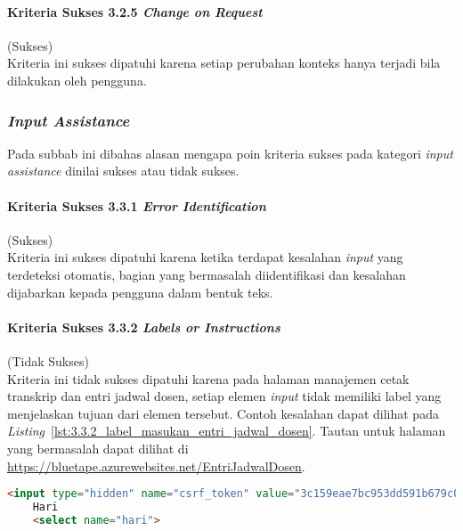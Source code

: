 \paragraph{Kriteria Sukses 3.2.5 \textit{Change on Request}}
\label{par:kepatuhan_bluetape_kriteria_sukses_3.2.5}
(Sukses)\\

Kriteria ini sukses dipatuhi karena setiap perubahan konteks hanya terjadi bila dilakukan oleh pengguna.

\subsubsection{\textit{Input Assistance}}
\label{subsubsec:kepatuhan_bluetape_input_assistance}
Pada subbab ini dibahas alasan mengapa poin kriteria sukses pada kategori \textit{input assistance} dinilai sukses atau tidak sukses.

\paragraph{Kriteria Sukses 3.3.1 \textit{Error Identification}}
\label{par:kepatuhan_bluetape_kriteria_sukses_3.3.1}
(Sukses)\\

Kriteria ini sukses dipatuhi karena ketika terdapat kesalahan \textit{input} yang terdeteksi otomatis, bagian yang bermasalah diidentifikasi dan kesalahan dijabarkan kepada pengguna dalam bentuk teks.

\paragraph{Kriteria Sukses 3.3.2 \textit{Labels or Instructions}}
\label{par:kepatuhan_bluetape_kriteria_sukses_3.3.2}
(Tidak Sukses)\\

Kriteria ini tidak sukses dipatuhi karena pada halaman manajemen cetak transkrip dan entri jadwal dosen, setiap elemen \textit{input} tidak memiliki label yang menjelaskan tujuan dari elemen tersebut. Contoh kesalahan dapat dilihat pada \mbox{\textit{Listing} \ref{lst:3.3.2_label_masukan_entri_jadwal_dosen}}. Tautan untuk halaman yang bermasalah dapat dilihat di \url{https://bluetape.azurewebsites.net/EntriJadwalDosen}.

\begin{lstlisting}[frame=single, label={lst:3.3.2_label_masukan_entri_jadwal_dosen}, language=HTML, caption=Pelanggaran Kriteria Sukses 3.3.2 pada Halaman Entri Jadwal Dosen]
    <input type="hidden" name="csrf_token" value="3c159eae7bc953dd591b679c080ed066"/>
    Hari
    <select name="hari">
\end{lstlisting}

